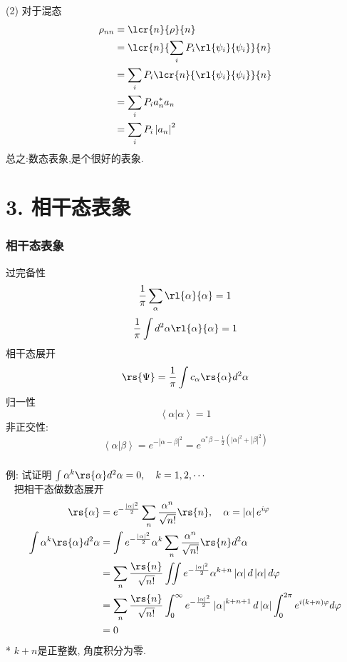 \begin{frame}  
 \frametitle{}
 (2) 对于混态  
 \[ \begin{aligned}
    \rho_{nn} & = \lcr{n}{\rho}{n} \\ 
    &= \lcr{n}{\sum_i P_i \rl{\psi_i}{\psi_i}}{n} \\ 
    &= \sum_i P_i \lcr{n}{ \rl{\psi_i}{\psi_i}}{n} \\ 
    &= \sum_i P_i a^*_{n} a_{n} \\ 
    &= \sum_i P_i \left|a_{n}\right|^2
  \end{aligned}\]  
  总之:数态表象,是个很好的表象.
\end{frame}

\section{3. 相干态表象}

\begin{frame} 
 \frametitle{相干态表象}
    过完备性
   \[\frac{1}{\pi}\sum_\alpha \rl{\alpha}{\alpha} =1 \]
   \[\frac{1}{\pi}\int d^2 \alpha \rl{\alpha}{\alpha} =1 \]
   相干态展开
   \[ \begin{aligned}
    \rs{\Psi} &= \frac{1}{\pi} \int c_\alpha \rs{\alpha} d^2 \alpha \\ 
  \end{aligned}\]
   归一性
   \[\left\langle \alpha|\alpha\right\rangle = 1 \]
   非正交性:
   \[ \left\langle \alpha| \beta \right\rangle =e^{-  \left| \alpha - \beta\right|^2} = e^{\alpha^* \beta -\frac{1}{2}(\left| \alpha \right|^2 +\left| \beta \right|^2  )  } \]
\end{frame}

\begin{frame} 
\frametitle{}
  例: 试证明 $\int  \alpha^k \rs{\alpha} d^2 \alpha =0, \quad k=1,2,\cdots $ \\
  \证~ 把相干态做数态展开
  \[ \begin{aligned}
    \rs{\alpha} &=  e^{-\frac{\left|\alpha\right|^2}{2}}  \sum_n \frac{\alpha^n}{\sqrt{n!}} \rs{n} , \quad  \alpha= \left|\alpha\right| e^{i\varphi} \\
    \int  \alpha^k \rs{\alpha} d^2 \alpha &= \int   e^{-\frac{\left|\alpha\right|^2}{2}} \alpha^k  \sum_n \frac{\alpha^n}{\sqrt{n!}} \rs{n} d^2\alpha \\ 
    &= \sum_n \frac{\rs{n} }{\sqrt{n!}} \iint  e^{-\frac{\left|\alpha\right|^2}{2}} \alpha^{k+n}  \left|\alpha \right| d \left|\alpha\right|d\varphi\\
    &= \sum_n \frac{\rs{n} }{\sqrt{n!}} \int_0 ^{\infty} e^{-\frac{\left|\alpha\right|^2}{2}} \left|\alpha\right|^{k+n+1} d \left|\alpha\right| \int_0 ^{2\pi} e^{i(k+n)\varphi} d\varphi\\
    &=0
  \end{aligned}\] 
  * $k+n$是正整数, 角度积分为零.
\end{frame}

